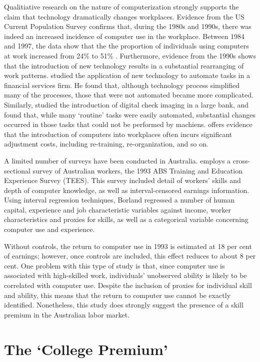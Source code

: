 Qualitiative research on the nature of computerization strongly supports the claim that technology dramatically changes workplaces. Evidence from the US Current Population Survey confirms that, during the 1980s and 1990s, there was indeed an increased incidence of computer use in the workplace. Between 1984 and 1997, the data show that the the proportion of individuals using computers at work increased from 24\% to 51\% \cite{Friedberg2003}. Furthermore, evidence from the 1990s shows that the introduction of new technology results in a substantial rearranging of work patterns. \citet{Levy1996} studied the application of new technology to automate tasks in a financial services firm. He found that, although technology process simplified many of the processes, those that were not automated became more complicated. Similarly, \citet{Autor2002} studied the introduction of digital check imaging in a large bank, and found that, while many `routine' tasks were easily automated, substantial changes occurred in those tasks that could not be performed by machiens. \citet{Bresnahan2002} offers evidence that the introduction of computers into workplaces often incurs significant adjustment costs, including re-training, re-organization, and so on.

A limited number of surveys have been conducted in Australia. \citet{Borland2004} employs a cross-sectional survey of Australian workers, the 1993 ABS Training and Education Experience Survey (TEES). This survey included detail of workers' skills and depth of computer knowledge, as well as interval-censored earnings information. Using interval regression techniques, Borland regressed a number of human capital, experience and job characteristic variables against income, worker characteristics and proxies for skills, as well as a categorical variable concerning computer use and experience. 

Without controls, the return to computer use in 1993 is estimated at 18 per cent of earnings; however, once controls are included, this effect reduces to about 8 per cent. One problem with this type of study is that, since computer use is associated with high-skilled work, individuals' unobserved ability is likely to be correlated with computer use. Despite the inclusion of proxies for individual skill and ability, this means that the return to computer use cannot be exactly identified. Nonetheless, this study does strongly suggest the presence of a skill premium in the Australian labor market.

\section{The `College Premium'}

